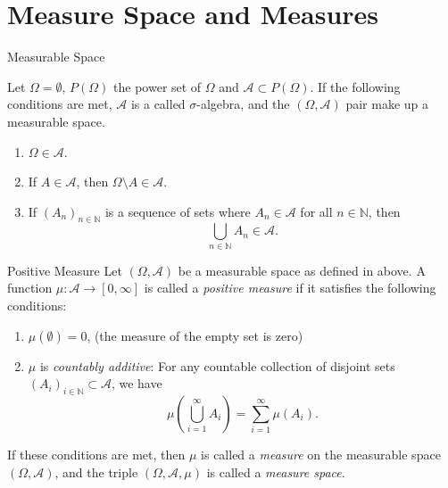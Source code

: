 \section{Measure Space and Measures}
\label{section:measurable_space}
\begin{note}
    {Measurable Space}

    Let $\Omega = \emptyset$, $P(\Omega)$ the power set of $\Omega$ and $\mathcal{A} \subset P(\Omega)$. If the following conditions are met, $\mathcal{A}$ is a called $\sigma$-algebra, and the $(\Omega, \mathcal{A})$ pair make up a measurable space.
    \begin{enumerate}
        \item $\Omega \in \mathcal{A}$.
        \item If $A \in \mathcal{A}$, then $\Omega \setminus A \in \mathcal{A}$.
        \item If $(A_n)_{n \in \mathbb{N}}$ is a sequence of sets where $A_n \in \mathcal{A}$ for all $n \in \mathbb{N}$, then 
        \begin{equation*}
            \bigcup_{n \in \mathbb{N}} A_n \in \mathcal{A}.
        \end{equation*}
    \end{enumerate}
\end{note}

\begin{note}
    {Positive Measure}
    Let $(\Omega, \mathcal{A})$ be a measurable space as defined in above. A function $\mu: \mathcal{A} \to [0, \infty]$ is called a \textit{positive measure} if it satisfies the following conditions:

    \begin{enumerate}
        \item $\mu(\emptyset) = 0$, (the measure of the empty set is zero)
        \item $\mu$ is \textit{countably additive}: For any countable collection of disjoint sets $(A_i)_{i \in \mathbb{N}} \subset \mathcal{A}$, we have
        \begin{equation*}
            \mu\left( \bigcup_{i=1}^{\infty} A_i \right) = \sum_{i=1}^{\infty} \mu(A_i).
        \end{equation*}
    \end{enumerate}
    
    If these conditions are met, then $\mu$ is called a \textit{measure} on the measurable space $(\Omega, \mathcal{A})$, and the triple $(\Omega, \mathcal{A}, \mu)$ is called a \textit{measure space}.
\end{note}



